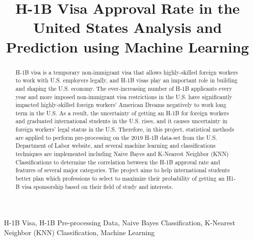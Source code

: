 \documentclass[conference]{IEEEtran}
\begin{document}
\title{H-1B Visa Approval Rate in the United States Analysis and Prediction using Machine Learning\\
}

\author{
\and
{}
}

\maketitle

\begin{abstract}
H-1B visa is a temporary non-immigrant visa that allows highly-skilled foreign workers to work with U.S. employers legally, and H-1B visas play an important role in building and shaping the U.S. economy. The ever-increasing number of H-1B applicants every year and more imposed non-immigrant visa restrictions in the U.S. have significantly impacted highly-skilled foreign workers' American Dreams negatively to work long term in the U.S. As a result, the uncertainty of getting an H-1B for foreign workers and graduated international students in the U.S. rises, and it causes uncertainty in foreign workers' legal status in the U.S. Therefore, in this project, statistical methods are applied to perform pre-processing on the 2019 H-1B data-set from the U.S. Department of Labor website, and several machine learning and classifications techniques are implemented including Naive Bayes and K-Nearest Neighbor (KNN) Classifications to determine the correlation between the H-1B approval rate and features of several major categories. The project aims to help international students better plan which professions to select to maximize their probability of getting an H1-B visa sponsorship based on their field of study and interests.
\end{abstract}

\begin{IEEEkeywords}
H-1B Visa, H-1B Pre-processing Data, Naive Bayes Classification, K-Nearest Neighbor (KNN) Classification, Machine Learning
\end{IEEEkeywords}
\end{document}

